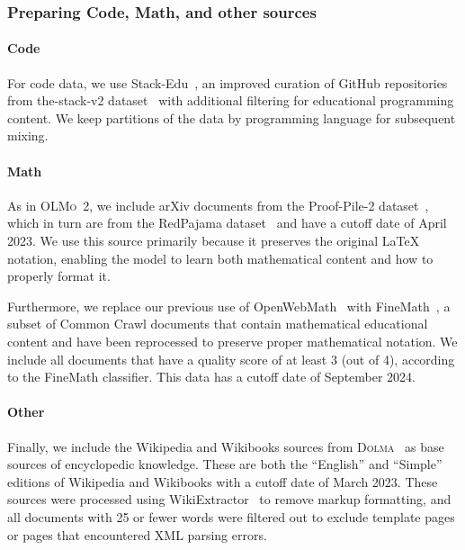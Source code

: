 \documentclass[table]{ai2style/ai2}
\newcommand{\oldOlmo}{OLMo\xspace}
\newcommand{\olmotoo}{\textsc{\oldOlmo~2}\xspace}
\newcommand{\dolma}{\textsc{Dolma}\xspace}
\begin{document}
\subsubsection{Preparing Code, Math, and other sources}
\label{sec:preparing-other-data}

\paragraph{Code} For code data, we use Stack-Edu~\citep{allal2025smollm2smolgoesbig}, an improved curation of GitHub repositories from the-stack-v2 dataset~\citep{lozhkov2024starcoder} with additional filtering for educational programming content. We keep partitions of the data by programming language for subsequent mixing.

\paragraph{Math}
As in \olmotoo, we include arXiv documents from the Proof-Pile-2 dataset~\citep{azerbayev2023llemma}, which in turn are from the RedPajama dataset~\citep{together2023redpajama} and have a cutoff date of April 2023. We use this source primarily because it preserves the original LaTeX notation, enabling the model to learn both mathematical content and how to properly format it.

Furthermore, we replace our previous use of OpenWebMath~\citep{paster2023openwebmath} with FineMath~\citep{allal2025smollm2smolgoesbig}, a subset of Common Crawl documents that contain mathematical educational content and have been reprocessed to preserve proper mathematical notation. We include all documents that have a quality score of at least 3 (out of 4), according to the FineMath classifier. This data has a cutoff date of September 2024.

\paragraph{Other} Finally, we include the Wikipedia and Wikibooks sources from \dolma~\citep{soldaini2024dolma} as base sources of encyclopedic knowledge. These are both the ``English'' and ``Simple'' editions of Wikipedia and Wikibooks with a cutoff date of March 2023. These sources were processed using WikiExtractor~\citep{Wikiextractor2015} to remove markup formatting, and all documents with 25 or fewer words were filtered out to exclude template pages or pages that encountered XML parsing errors.
\end{document}
